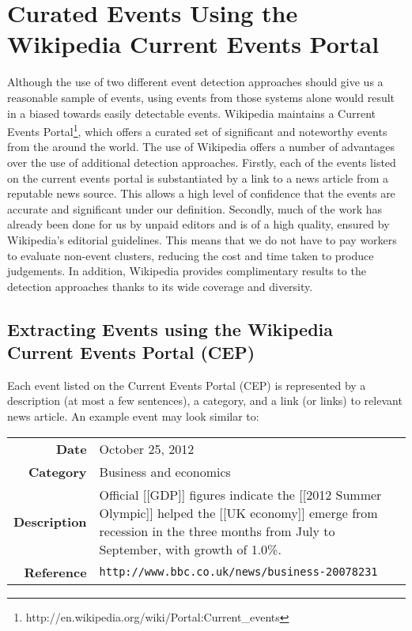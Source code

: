 \section{Curated Events Using the Wikipedia Current Events Portal}
Although the use of two different event detection approaches should give us a reasonable sample of events, using events from those systems alone would result in a biased towards easily detectable events.
Wikipedia maintains a Current Events Portal\footnote{http://en.wikipedia.org/wiki/Portal:Current\_events}, which offers a curated set of significant and noteworthy events from the around the world.
The use of Wikipedia offers a number of advantages over the use of additional detection approaches.
Firstly, each of the events listed on the current events portal is substantiated by a link to a news article from a reputable news source.
This allows a high level of confidence that the events are accurate and significant under our definition.
Secondly, much of the work has already been done for us by unpaid editors and is of a high quality, ensured by Wikipedia's editorial guidelines.
This means that we do not have to pay workers to evaluate non-event clusters, reducing the cost and time taken to produce judgements.
In addition, Wikipedia provides complimentary results to the detection approaches thanks to its wide coverage and diversity.

\subsection{Extracting Events using the Wikipedia Current Events Portal (CEP)}
Each event listed on the Current Events Portal (CEP) is represented by a description (at most a few sentences), a category, and a link (or links) to relevant news article.
An example event may look similar to:

{
\begin{tabulary}{\textwidth}{r L}
\textbf{Date} & October 25, 2012\\
\textbf{Category} & Business and economics\\
\textbf{Description} & Official [[GDP]] figures indicate the [[2012 Summer Olympic]] helped the [[UK economy]] emerge from recession in the three months from July to September, with growth of 1.0\%. \\
\textbf{Reference} & \texttt{http://www.bbc.co.uk/news/business-20078231}\\
\end{tabulary}
}

